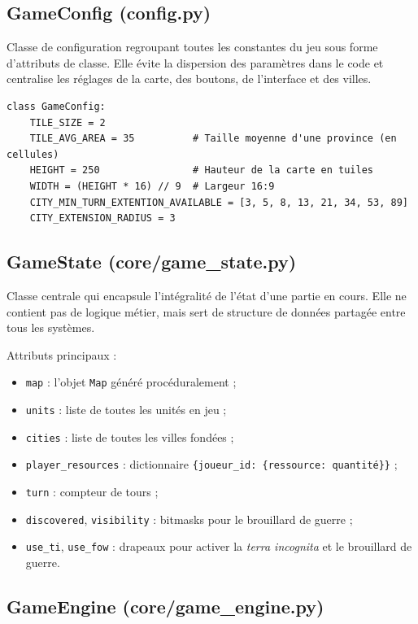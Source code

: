 \documentclass[12pt, a4paper]{article}
\begin{document}
\subsection{GameConfig (config.py)}

Classe de configuration regroupant toutes les constantes du jeu sous forme d'attributs de
classe. Elle évite la dispersion des paramètres dans le code et centralise les réglages de la
carte, des boutons, de l'interface et des villes.

\begin{lstlisting}[style=python, caption={Extrait de \texttt{config.py}}]
class GameConfig:
    TILE_SIZE = 2
    TILE_AVG_AREA = 35          # Taille moyenne d'une province (en cellules)
    HEIGHT = 250                # Hauteur de la carte en tuiles
    WIDTH = (HEIGHT * 16) // 9  # Largeur 16:9
    CITY_MIN_TURN_EXTENTION_AVAILABLE = [3, 5, 8, 13, 21, 34, 53, 89]
    CITY_EXTENSION_RADIUS = 3
\end{lstlisting}

\subsection{GameState (core/game\_state.py)}

Classe centrale qui encapsule l'intégralité de l'état d'une partie en cours. Elle ne contient
pas de logique métier, mais sert de structure de données partagée entre tous les systèmes.

Attributs principaux :
\begin{itemize}
    \item \texttt{map} : l'objet \texttt{Map} généré procéduralement ;
    \item \texttt{units} : liste de toutes les unités en jeu ;
    \item \texttt{cities} : liste de toutes les villes fondées ;
    \item \texttt{player\_resources} : dictionnaire \texttt{\{joueur\_id: \{ressource: quantité\}\}} ;
    \item \texttt{turn} : compteur de tours ;
    \item \texttt{discovered}, \texttt{visibility} : bitmasks pour le brouillard de guerre ;
    \item \texttt{use\_ti}, \texttt{use\_fow} : drapeaux pour activer la \textit{terra incognita} et
    le brouillard de guerre.
\end{itemize}

\subsection{GameEngine (core/game\_engine.py)}
\end{document}
